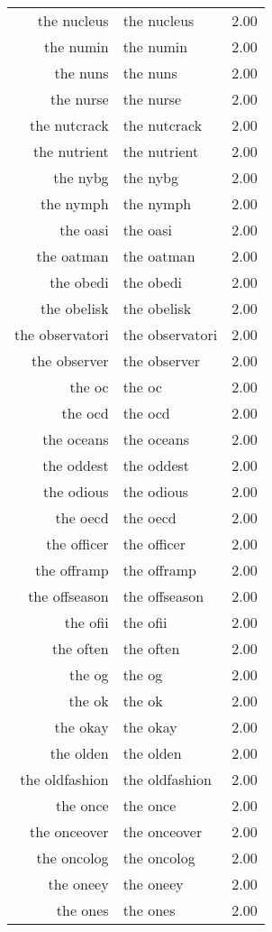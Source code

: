 \begin{table}[ht]
\begin{tabular}{rlr}
  the nucleus & the nucleus & 2.00 \\ 
  the numin & the numin & 2.00 \\ 
  the nuns & the nuns & 2.00 \\ 
  the nurse & the nurse & 2.00 \\ 
  the nutcrack & the nutcrack & 2.00 \\ 
  the nutrient & the nutrient & 2.00 \\ 
  the nybg & the nybg & 2.00 \\ 
  the nymph & the nymph & 2.00 \\ 
  the oasi & the oasi & 2.00 \\ 
  the oatman & the oatman & 2.00 \\ 
  the obedi & the obedi & 2.00 \\ 
  the obelisk & the obelisk & 2.00 \\ 
  the observatori & the observatori & 2.00 \\ 
  the observer & the observer & 2.00 \\ 
  the oc & the oc & 2.00 \\ 
  the ocd & the ocd & 2.00 \\ 
  the oceans & the oceans & 2.00 \\ 
  the oddest & the oddest & 2.00 \\ 
  the odious & the odious & 2.00 \\ 
  the oecd & the oecd & 2.00 \\ 
  the officer & the officer & 2.00 \\ 
  the offramp & the offramp & 2.00 \\ 
  the offseason & the offseason & 2.00 \\ 
  the ofii & the ofii & 2.00 \\ 
  the often & the often & 2.00 \\ 
  the og & the og & 2.00 \\ 
  the ok & the ok & 2.00 \\ 
  the okay & the okay & 2.00 \\ 
  the olden & the olden & 2.00 \\ 
  the oldfashion & the oldfashion & 2.00 \\ 
  the once & the once & 2.00 \\ 
  the onceover & the onceover & 2.00 \\ 
  the oncolog & the oncolog & 2.00 \\ 
  the oneey & the oneey & 2.00 \\ 
  the ones & the ones & 2.00 \\ 

\end{tabular}
\end{table}
